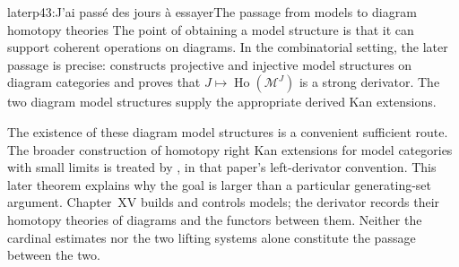 \begin{dcomment}{later}{p43:J'ai passé des jours à essayer}{The passage from models to diagram homotopy theories}
The point of obtaining a model structure is that it can support coherent operations on diagrams. In the combinatorial setting, the later passage is precise: \citet[Theorem~1.28 and Proposition~1.30]{Groth2013} constructs projective and injective model structures on diagram categories and proves that $J\mapsto\operatorname{Ho}(\mathcal M^J)$ is a strong derivator. The two diagram model structures supply the appropriate derived Kan extensions.

The existence of these diagram model structures is a convenient sufficient route. The broader construction of homotopy right Kan extensions for model categories with small limits is treated by \citet[Theorem~6.11]{Cisinski2003}, in that paper's left-derivator convention. This later theorem explains why the goal is larger than a particular generating-set argument. Chapter~XV builds and controls models; the derivator records their homotopy theories of diagrams and the functors between them. Neither the cardinal estimates nor the two lifting systems alone constitute the passage between the two.
\end{dcomment}


